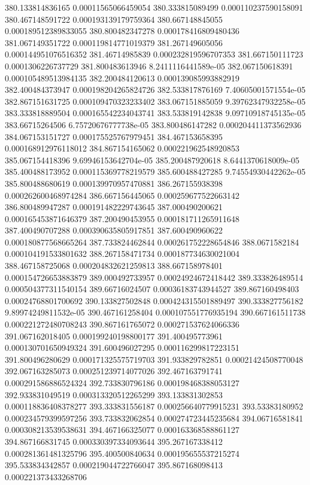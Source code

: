 {380.133814836165 0.00011565066459054
380.333815089499 0.000110237590158091
380.467148591722 0.000193139179759364
380.667148845055 0.000189512389833055
380.800482347278 0.000178416809480436
381.067149351722 0.000119814771019379
381.267149605056 0.000144951076516352
381.46714985839 0.000232819596707353
381.667150111723 0.0001306226737729
381.800483613946 8.2411116441589e-05
382.067150618391 0.000105489513984135
382.200484120613 0.000139085993882919
382.400484373947 0.000198204265824726
382.533817876169 7.40605001571554e-05
382.867151631725 0.000109470323233402
383.067151885059 9.39762347932258e-05
383.333818889504 0.000165542234043741
383.533819142838 9.09710918745135e-05
383.66715264506 6.75720676777738e-05
383.800486147282 0.000204411373562936
384.067153151727 0.000175525767979451
384.467153658395 0.000168912976118012
384.867154165062 0.000221962548920853
385.067154418396 9.69946153642704e-05
385.200487920618 8.6441370618009e-05
385.400488173952 0.000115369778219579
385.600488427285 9.74554930442262e-05
385.800488680619 0.000139970957470881
386.267155938398 0.000262600468974284
386.667156445065 0.000259677522663142
386.800489947287 0.000191482229743645
387.000490200621 0.000165453871646379
387.200490453955 0.000181711265911648
387.400490707288 0.000390635805917851
387.600490960622 0.000180877568665264
387.733824462844 0.000261752228654846
388.0671582184 0.000104191533801632
388.267158471734 0.000187734630021004
388.467158725068 0.000204832621259813
388.667158978401 0.000154726653883879
389.000492733957 0.00024924672418442
389.333826489514 0.000504377311540154
389.66716024507 0.00036183743944527
389.867160498403 0.00024768801700692
390.133827502848 0.000424315501889497
390.333827756182 9.89974249811532e-05
390.467161258404 0.000107551776935194
390.667161511738 0.000221272480708243
390.867161765072 0.000271537624066336
391.067162018405 0.000199240198800177
391.400495773961 0.000130701650949324
391.600496027295 0.000116299817223151
391.800496280629 0.000171325575719703
391.933829782851 0.00021424508770048
392.067163285073 0.000251239714077026
392.467163791741 0.000291586886524324
392.733830796186 0.000198468388053127
392.933831049519 0.000313320512265299
393.133831302853 0.000118836408378277
393.333831556187 0.000256640779915231
393.53383180952 0.000234579399597256
393.733832062854 0.000274723445235684
394.06716581841 0.000308213539538631
394.467166325077 0.000163368588861127
394.867166831745 0.000330397334093644
395.267167338412 0.000281361481325796
395.400500840634 0.000195655537215274
395.533834342857 0.000219044722766047
395.867168098413 0.000221373433268706
}

